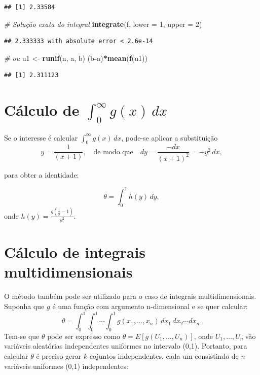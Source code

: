 \documentclass[
]{book}
\newenvironment{Shaded}{\begin{snugshade}}{\end{snugshade}}
\newcommand{\AttributeTok}[1]{\textcolor[rgb]{0.13,0.29,0.53}{#1}}
\newcommand{\CommentTok}[1]{\textcolor[rgb]{0.56,0.35,0.01}{\textit{#1}}}
\newcommand{\DecValTok}[1]{\textcolor[rgb]{0.00,0.00,0.81}{#1}}
\newcommand{\FunctionTok}[1]{\textcolor[rgb]{0.13,0.29,0.53}{\textbf{#1}}}
\newcommand{\NormalTok}[1]{#1}
\newcommand{\OtherTok}[1]{\textcolor[rgb]{0.56,0.35,0.01}{#1}}
\newcommand{\SpecialCharTok}[1]{\textcolor[rgb]{0.81,0.36,0.00}{\textbf{#1}}}
\begin{document}
\begin{verbatim}
## [1] 2.33584
\end{verbatim}

\begin{Shaded}
\begin{Highlighting}[]
\CommentTok{\# Solução exata do integral}
\FunctionTok{integrate}\NormalTok{(f, }\AttributeTok{lower =} \DecValTok{1}\NormalTok{, }\AttributeTok{upper =} \DecValTok{2}\NormalTok{)}
\end{Highlighting}
\end{Shaded}

\begin{verbatim}
## 2.333333 with absolute error < 2.6e-14
\end{verbatim}

\begin{Shaded}
\begin{Highlighting}[]
\CommentTok{\# ou}
\NormalTok{u1 }\OtherTok{\textless{}{-}} \FunctionTok{runif}\NormalTok{(n, a, b)}
\NormalTok{(b}\SpecialCharTok{{-}}\NormalTok{a)}\SpecialCharTok{*}\FunctionTok{mean}\NormalTok{(}\FunctionTok{f}\NormalTok{(u1))}
\end{Highlighting}
\end{Shaded}

\begin{verbatim}
## [1] 2.311123
\end{verbatim}

\section{\texorpdfstring{Cálculo de \(\int_{0}^{\infty}g(x)\, dx\)}{Cálculo de \textbackslash int\_\{0\}\^{}\{\textbackslash infty\}g(x)\textbackslash, dx}}\label{cuxe1lculo-de-int_0inftygx-dx}

Se o interesse é calcular \(\int_{0}^{\infty}g(x)\, dx\), pode-se aplicar
a substituição
\[y=\frac{1}{(x+1)}, \quad \text{de modo que} \quad dy=\frac{-dx}{(x+1)^2}=-y^2\,dx,\]

para obter a identidade:

\[\theta = \int_{0}^{1}h(y)\,dy,\] onde
\(h(y)=\frac{g(\frac{1}{y}-1)}{y^2}\).

\section{Cálculo de integrais multidimensionais}\label{cuxe1lculo-de-integrais-multidimensionais}

O método também pode ser utilizado para o caso de integrais
multidimensionais. Suponha que \(g\) é uma função com argumento
n-dimensional e se quer calcular:
\[\theta = \int_{0}^{1}\int_{0}^{1}\cdots \int_{0}^{1} g(x_1, \ldots,x_n)\, dx_1 \, dx_2\cdots dx_n.\]
Tem-se que \(\theta\) pode ser expresso como
\(\theta = E[g(U_1,\ldots,U_n)]\), onde \(U_1,\ldots,U_n\) são variáveis
aleatórias independentes uniformes no intervalo (0,1). Portanto, para
calcular \(\theta\) é preciso gerar \(k\) cojuntos independentes, cada um
consistindo de \(n\) variáveis uniformes (0,1) independentes:
\end{document}
